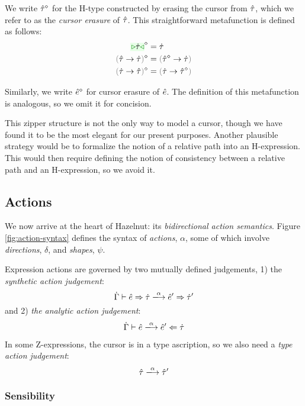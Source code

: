 We write $\hat{\tau}^{\diamond}$ for the H-type constructed by erasing the
cursor from $\hat{\tau}$, which we refer to as the \emph{cursor erasure} of
$\hat{\tau}$. This straightforward metafunction is defined as follows:
\begin{align*}
\removeSel{\zwsel{\htau}} & = \htau\\
\removeSel{\tarr{\ztau}{\htau}} & = \tarr{\removeSel{\ztau}}{\htau}\\
\removeSel{\tarr{\htau}{\ztau}} & = \tarr{\htau}{\removeSel{\ztau}}
\end{align*}

Similarly, we write $\hat{e}^{\diamond}$ for cursor erasure of $\hat{e}$. The definition of this metafunction is analogous, so we omit it
for concision.

This zipper structure is not the only way to model a cursor, though we have found it to be the most elegant for our present purposes. Another plausible strategy would be to formalize the notion of a relative path into an H-expression. This would then require defining the notion of consistency between a relative path and an H-expression, so we avoid it.

\subsection{Actions}\label{sec:actions}

We now arrive at the heart of Hazelnut: its \emph{bidirectional action
  semantics}.  Figure \ref{fig:action-syntax} defines the syntax of
\emph{actions}, $\alpha$, some of which involve \emph{directions},
$\delta$, and \emph{shapes}, $\psi$.

Expression actions are governed by two mutually defined judgements, 1) the
\emph{synthetic action judgement}:
\[
\performSyn{\hGamma}{\zexp}{\htau}{\alpha}{\zexp'}{\htau'}
\]
and 2) \emph{the analytic action judgement}:
\[
\performAna{\hGamma}{\zexp}{\htau}{\alpha}{\zexp'}
\]

In some Z-expressions, the cursor is in a type ascription, so we also need
a \emph{type action judgement}:
\[
\performTyp{\ztau}{\alpha}{\ztau'}
\]

\subsubsection{Sensibility}


